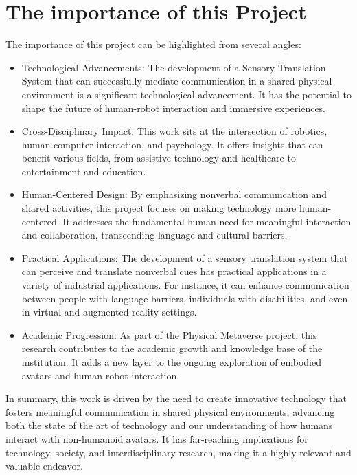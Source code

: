 \documentclass{Configuration_Files/PoliMi3i_thesis}
\begin{document}
\section{The importance of this Project}
The importance of this project can be highlighted from several angles:
\begin{itemize}
\item Technological Advancements: The development of a Sensory Translation System that can successfully mediate communication in a shared physical environment is a significant technological advancement. It has the potential to shape the future of human-robot interaction and immersive experiences.
\item Cross-Disciplinary Impact: This work sits at the intersection of robotics, human-computer interaction, and psychology. It offers insights that can benefit various fields, from assistive technology and healthcare to entertainment and education.
\item Human-Centered Design: By emphasizing nonverbal communication and shared activities, this project focuses on making technology more human-centered. It addresses the fundamental human need for meaningful interaction and collaboration, transcending language and cultural barriers.
\item Practical Applications: The development of a sensory translation system that can perceive and translate nonverbal cues has practical applications in a variety of industrial applications. For instance, it can enhance communication between people with language barriers, individuals with disabilities, and even in virtual and augmented reality settings.
\item Academic Progression: As part of the Physical Metaverse project, this research contributes to the academic growth and knowledge base of the institution. It adds a new layer to the ongoing exploration of embodied avatars and human-robot interaction.
\end{itemize}

In summary, this work is driven by the need to create innovative technology that fosters meaningful communication in shared physical environments, advancing both the state of the art of technology and our understanding of how humans interact with non-humanoid avatars. It has far-reaching implications for technology, society, and interdisciplinary research, making it a highly relevant and valuable endeavor.
\end{document}
